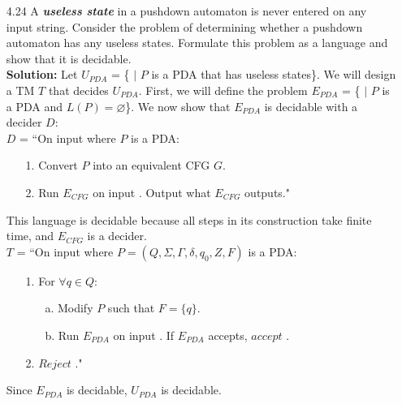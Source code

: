 \begin{enumerate}
\item[4.24]A \emph{\textbf{useless state}} in a pushdown automaton is never entered on any input string. Consider the problem of determining whether a pushdown automaton has any useless states. Formulate this problem as a language and show that it is decidable.
\\
\textbf{Solution:} Let $U_{PDA}$ = \{ $|$ $P$ is a PDA that has useless states\}. We will design a TM $T$ that decides $U_{PDA}$. First, we will define the problem $E_{PDA}$ = \{ $|$ $P$ is a PDA and $L(P) = \varnothing$\}. We now show that $E_{PDA}$ is decidable with a decider $D$:
\\
$D$ = ``On input  where $P$ is a PDA:
\begin{enumerate}
\itemsep0em
\item[1.]Convert $P$ into an equivalent CFG $G$.
\item[2.]Run $E_{CFG}$ on input . Output what $E_{CFG}$ outputs."
\end{enumerate}
This language is decidable because all steps in its construction take finite time, and $E_{CFG}$ is a decider.
\\
$T$ = ``On input  where $P = (Q, \Sigma, \Gamma, \delta, q_0, Z, F)$ is a PDA:
\begin{enumerate}
\itemsep0em
\item[1.]For $\forall q \in Q$:
\begin{enumerate}
\item[a.]Modify $P$ such that $F = \{q\}$.
\item[b.]Run $E_{PDA}$ on input . If $E_{PDA}$ accepts, $accept$ .
\end{enumerate}
\item[2.]$Reject$ ."
\end{enumerate}
Since $E_{PDA}$ is decidable, $U_{PDA}$ is decidable.
\end{enumerate}